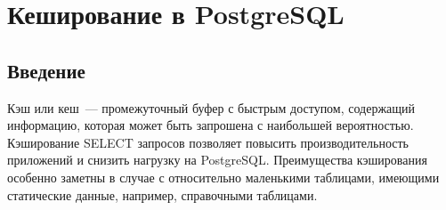 \chapter{Кеширование в PostgreSQL}
\begin{epigraphs}
\end{epigraphs}
\section{Введение}
Кэш или кеш~--- промежуточный буфер с быстрым доступом, содержащий информацию, которая может быть запрошена с наибольшей вероятностью.
Кэширование SELECT запросов позволяет повысить производительность приложений и снизить нагрузку на PostgreSQL. 
Преимущества кэширования особенно заметны в случае с относительно маленькими таблицами, имеющими статические данные, 
например, справочными таблицами. 